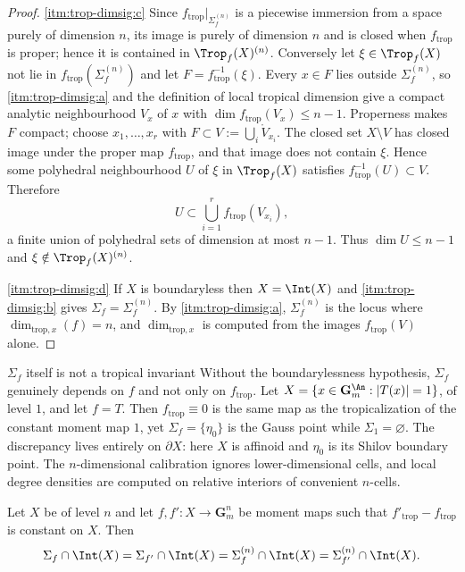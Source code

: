 \begin{proof}
\cref{itm:trop-dimsig:c} Since $f_{\mathrm{trop}}|_{\Sigma_f^{(n)}}$ is a
piecewise immersion from a space purely of dimension $n$, its image is
purely of dimension $n$ and is closed when $f_{\mathrm{trop}}$ is proper;
hence it is contained in $\Trop_f(X)^{(n)}$. Conversely let
$\xi\in\Trop_f(X)$ not lie in $f_{\mathrm{trop}}(\Sigma_f^{(n)})$ and let
$F=f_{\mathrm{trop}}^{-1}(\xi)$. Every $x\in F$ lies outside
$\Sigma_f^{(n)}$, so \cref{itm:trop-dimsig:a} and the definition of local
tropical dimension give a compact analytic neighbourhood $V_x$ of $x$ with
$\dim f_{\mathrm{trop}}(V_x)\le n-1$. Properness makes $F$ compact; choose
$x_1,\ldots,x_r$ with $F\subset V:=\bigcup_i\mathring V_{x_i}$. The closed
set $X\setminus V$ has closed image under the proper map
$f_{\mathrm{trop}}$, and that image does not contain $\xi$. Hence some
polyhedral neighbourhood $U$ of $\xi$ in $\Trop_f(X)$ satisfies
$f_{\mathrm{trop}}^{-1}(U)\subset V$. Therefore
\[
 U\subset\bigcup_{i=1}^r f_{\mathrm{trop}}(V_{x_i}),
\]
a finite union of polyhedral sets of dimension at most $n-1$. Thus
$\dim U\le n-1$ and $\xi\notin\Trop_f(X)^{(n)}$.

\cref{itm:trop-dimsig:d} If $X$ is boundaryless then $X=\Int(X)$ and
\cref{itm:trop-dimsig:b} gives $\Sigma_f=\Sigma_f^{(n)}$. By
\cref{itm:trop-dimsig:a}, $\Sigma_f^{(n)}$ is the locus where
$\dim_{\mathrm{trop},x}(f)=n$, and $\dim_{\mathrm{trop},x}$ is computed
from the images $f_{\mathrm{trop}}(V)$ alone.
\end{proof}

\begin{warning}{$\Sigma_f$ itself is not a tropical invariant}
Without the boundarylessness hypothesis, $\Sigma_f$ genuinely depends on $f$
and not only on $f_{\mathrm{trop}}$. Let $X=\{x\in\mathbf G_m^{\An}:|T(x)|=1\}$,
of level $1$, and let $f=T$. Then $f_{\mathrm{trop}}\equiv0$ is the same map
as the tropicalization of the constant moment map $1$, yet
$\Sigma_f=\{\eta_0\}$ is the Gauss point while $\Sigma_1=\varnothing$. The
discrepancy lives entirely on $\partial X$: here $X$ is affinoid and
$\eta_0$ is its Shilov boundary point. The $n$-dimensional calibration
ignores lower-dimensional cells, and local degree densities are computed
on relative interiors of convenient $n$-cells.
\end{warning}

\begin{corollary}
\label{cor:trop-sigma-translation}
Let $X$ be of level $n$ and let $f,f':X\to\mathbf G_m^n$ be moment maps such
that $f'_{\mathrm{trop}}-f_{\mathrm{trop}}$ is constant on $X$. Then
\[
 \Sigma_f\cap\Int(X)=\Sigma_{f'}\cap\Int(X)
 =\Sigma_f^{(n)}\cap\Int(X)=\Sigma_{f'}^{(n)}\cap\Int(X).
\]
\end{corollary}

